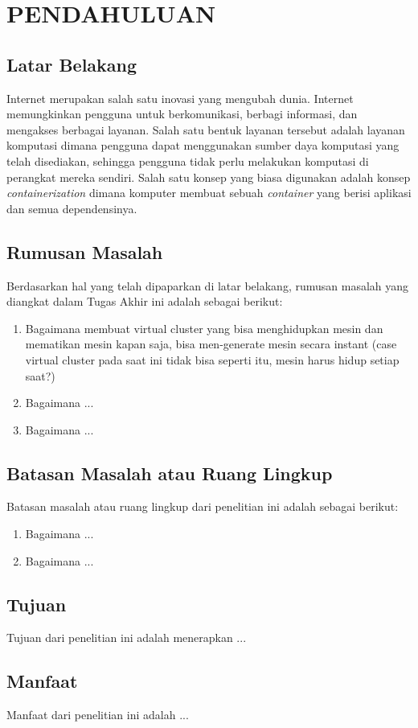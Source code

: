 \chapter{PENDAHULUAN}

\section{Latar Belakang}

Internet merupakan salah satu inovasi yang mengubah dunia. Internet
memungkinkan pengguna untuk berkomunikasi, berbagi informasi, dan
mengakses berbagai layanan. Salah satu bentuk layanan tersebut adalah
layanan komputasi dimana pengguna dapat menggunakan sumber daya komputasi
yang telah disediakan, sehingga pengguna tidak perlu melakukan komputasi
di perangkat mereka sendiri. Salah satu konsep yang biasa digunakan
adalah konsep \emph{containerization} dimana komputer membuat sebuah \emph{container}
yang berisi aplikasi dan semua dependensinya. \emph{}

\section{Rumusan Masalah}

Berdasarkan hal yang telah dipaparkan di latar belakang, rumusan masalah
yang diangkat dalam Tugas Akhir ini adalah sebagai berikut:
\begin{enumerate}
  \vspace{-0.3cm}\item{Bagaimana membuat virtual cluster yang bisa
  menghidupkan mesin dan mematikan mesin kapan saja, bisa men-generate
  mesin secara instant (case virtual cluster pada saat ini tidak bisa seperti itu,
  mesin harus hidup setiap saat?)}
  \vspace{-0.3cm}\item{Bagaimana ...}
  \vspace{-0.3cm}\item{Bagaimana ...}
\end{enumerate}

\section{Batasan Masalah atau Ruang Lingkup}

Batasan masalah atau ruang lingkup dari penelitian ini adalah sebagai berikut:
\begin{enumerate}
  \vspace{-0.3cm}\item{Bagaimana ...}
  \vspace{-0.3cm}\item{Bagaimana ...}
\end{enumerate}

\section{Tujuan}

Tujuan dari penelitian ini adalah menerapkan ...

\section{Manfaat}

Manfaat dari penelitian ini adalah ...
